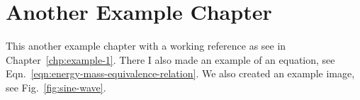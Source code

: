 \documentclass[\main/master.tex]{subfiles}
\begin{document}
\chapter{Another Example Chapter}\label{chp:example-2}
\hspace{5 mm} This another example chapter with a working reference as see in Chapter~\ref{chp:example-1}. There I also made an example of an equation, see Eqn.~\ref{eqn:energy-mass-equivalence-relation}. We also created an example image, see Fig.~\ref{fig:sine-wave}.
\end{document}
